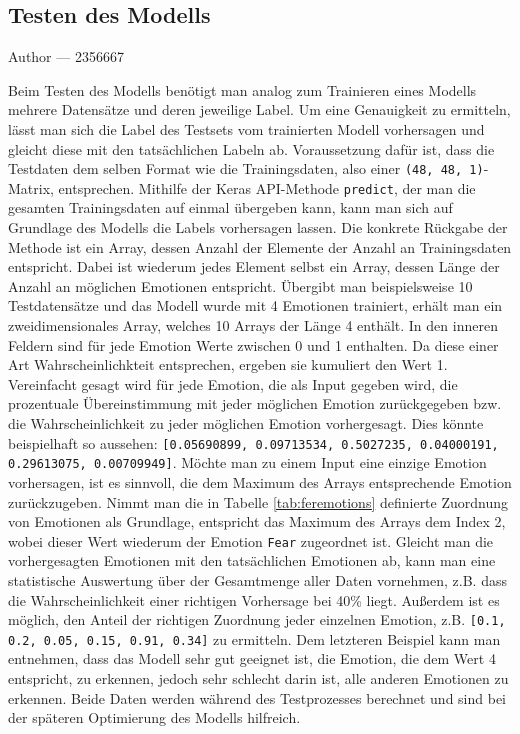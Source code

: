\documentclass[12pt, a4paper]{report}
\makeatletter
\newcommand{\sectionauthor}[1]{%
  {\parindent0pt\vspace*{-5pt}%
  \large{Author --- }
  \linespread{1.1}\large\scshape#1%
  \par\nobreak\vspace*{35pt} }
  \@afterheading%
}
\makeatother
\begin{document}
\subsection{Testen des Modells}
\sectionauthor{2356667}
Beim Testen des Modells benötigt man analog zum Trainieren eines Modells mehrere Datensätze und deren jeweilige Label. Um eine Genauigkeit zu ermitteln, lässt man sich die Label des Testsets vom trainierten Modell vorhersagen und gleicht diese mit den tatsächlichen Labeln ab. Voraussetzung dafür ist, dass die Testdaten dem selben Format wie die Trainingsdaten, also einer \texttt{(48, 48, 1)}-Matrix, entsprechen. Mithilfe der Keras API-Methode \texttt{predict}, der man die gesamten Trainingsdaten auf einmal übergeben kann, kann man sich auf Grundlage des Modells die Labels vorhersagen lassen. Die konkrete Rückgabe der Methode ist ein Array, dessen Anzahl der Elemente der Anzahl an Trainingsdaten entspricht. Dabei ist wiederum jedes Element selbst ein Array, dessen Länge der Anzahl an möglichen Emotionen entspricht. Übergibt man beispielsweise 10 Testdatensätze und das Modell wurde mit 4 Emotionen trainiert, erhält man ein zweidimensionales Array, welches 10 Arrays der Länge 4 enthält. In den inneren Feldern sind für jede Emotion Werte zwischen 0 und 1 enthalten. Da diese einer Art Wahrscheinlichkteit entsprechen, ergeben sie kumuliert den Wert 1. Vereinfacht gesagt wird für jede Emotion, die als Input gegeben wird, die prozentuale Übereinstimmung mit jeder möglichen Emotion zurückgegeben bzw. die Wahrscheinlichkeit zu jeder möglichen Emotion vorhergesagt. Dies könnte beispielhaft so aussehen: \texttt{[0.05690899, 0.09713534, 0.5027235,  0.04000191, 0.29613075, 0.00709949]}. Möchte man zu einem Input eine einzige Emotion vorhersagen, ist es sinnvoll, die dem Maximum des Arrays entsprechende Emotion zurückzugeben. Nimmt man die in Tabelle \ref{tab:feremotions} definierte Zuordnung von Emotionen als Grundlage, entspricht das Maximum des Arrays dem Index 2, wobei dieser Wert wiederum der Emotion \texttt{Fear} zugeordnet ist.\newline
Gleicht man die vorhergesagten Emotionen mit den tatsächlichen Emotionen ab, kann man eine statistische Auswertung über der Gesamtmenge aller Daten vornehmen, z.B. dass die Wahrscheinlichkeit einer richtigen Vorhersage bei 40\% liegt. Außerdem ist es möglich, den Anteil der richtigen Zuordnung jeder einzelnen Emotion, z.B. \texttt{[0.1, 0.2, 0.05, 0.15, 0.91, 0.34]} zu ermitteln. Dem letzteren Beispiel kann man entnehmen, dass das Modell sehr gut geeignet ist, die Emotion, die dem Wert 4 entspricht, zu erkennen, jedoch sehr schlecht darin ist, alle anderen Emotionen zu erkennen. Beide Daten werden während des Testprozesses berechnet und sind bei der späteren Optimierung des Modells hilfreich.
\end{document}
